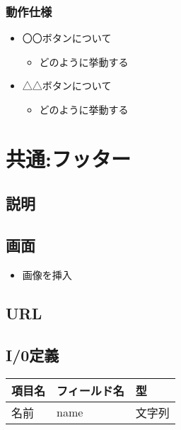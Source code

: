 \documentclass[letterpaper,10pt,dvipdfmx]{sphinxmanual}
\begin{document}
\subsection{動作仕様}
\label{\detokenize{header:id5}}\begin{itemize}
\item {} 
〇〇ボタンについて
\begin{itemize}
\item {} 
どのように挙動する

\end{itemize}

\item {} 
△△ボタンについて
\begin{itemize}
\item {} 
どのように挙動する

\end{itemize}

\end{itemize}


\chapter{共通:フッター}
\label{\detokenize{footer:id1}}\label{\detokenize{footer::doc}}

\section{説明}
\label{\detokenize{footer:id2}}

\section{画面}
\label{\detokenize{footer:id3}}\begin{itemize}
\item {} 
画像を挿入

\end{itemize}


\section{URL}
\label{\detokenize{footer:url}}

\section{I/0定義}
\label{\detokenize{footer:i-0}}


\begin{savenotes}\sphinxattablestart
\centering
\begin{tabulary}{\linewidth}[t]{|T|T|T|}
\hline
\sphinxstyletheadfamily 
項目名
&\sphinxstyletheadfamily 
フィールド名
&\sphinxstyletheadfamily 
型
\\
\hline
名前
&
name
&
文字列
\\
\hline
\end{tabulary}
\par
\sphinxattableend\end{savenotes}
\end{document}
